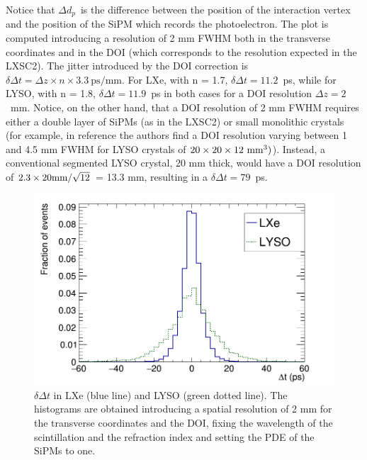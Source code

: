 \documentclass[11pt,a4paper]{article}
\begin{document}
Notice that $\Delta d_p$~is the difference 
between the position of the interaction vertex and the position of the SiPM which records the photoelectron. 
The plot is computed introducing a resolution of 2 mm FWHM both in the transverse coordinates and
in the DOI (which corresponds to the resolution expected in the LXSC2). The jitter introduced by the DOI correction is
$
\delta \Delta t =\Delta z \times n \times 3.3\ \textrm{ps/mm}
$.
%
For LXe, with n = 1.7, $\delta \Delta t = 11.2$~ps, while for  LYSO, with n = 1.8, $\delta \Delta t = 11.9$~ps in both cases for a DOI resolution $\Delta z = 2$~mm. Notice, on the other hand, that a DOI resolution of 2 mm FWHM requires either a double layer of SiPMs (as in the LXSC2) or small monolithic crystals (for example, in reference \cite{VanDamm2011} the authors find a DOI resolution varying between 1 and 4.5 mm FWHM for LYSO crystals of 
$20 \times 20 \times 12 ~{\rm mm^3})$). Instead, a conventional segmented LYSO crystal, 20 mm
thick, would have a DOI resolution of $2.3 \times 20{\rm mm}/\sqrt{12}$ = 13.3 mm, resulting in a $\delta \Delta t = 79$~ps.

\begin{figure}[!bhtp]
	\centering
	\includegraphics[scale=0.4]{img/DTOFLXeLYSO.png}
	\caption{\label{fig.dtof} $\delta \Delta t$ in LXe (blue line) and LYSO (green dotted line). The
	histograms are obtained introducing a spatial resolution of 2 mm for the transverse coordinates and
	the DOI, fixing the wavelength of the scintillation and the refraction index and setting the PDE of the SiPMs to one. }
\end{figure}
\end{document}
